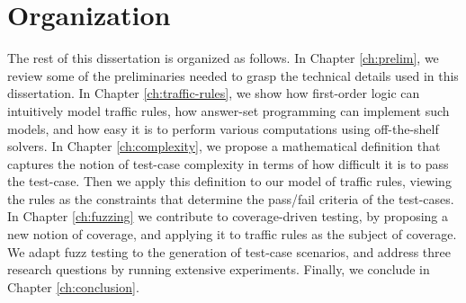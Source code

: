 \section{Organization}

The rest of this dissertation is organized as follows.
%
In Chapter \ref{ch:prelim}, we review some of the preliminaries needed to grasp the technical details used in this dissertation.
%
In Chapter \ref{ch:traffic-rules}, we show how first-order logic can intuitively model traffic rules, how answer-set programming can implement such models, and how easy it is to perform various computations using off-the-shelf solvers.
%
In Chapter \ref{ch:complexity}, we propose a mathematical definition that captures the notion of test-case complexity in terms of how difficult it is to pass the test-case.
%
Then we apply this definition to our model of traffic rules, viewing the rules as the constraints that determine the pass/fail criteria of the test-cases.
%
In Chapter \ref{ch:fuzzing} we contribute to coverage-driven testing, by proposing a new notion of coverage, and applying it to traffic rules as the subject of coverage.
%
We adapt fuzz testing to the generation of test-case scenarios, and address three research questions by running extensive experiments.
%
Finally, we conclude in Chapter \ref{ch:conclusion}.